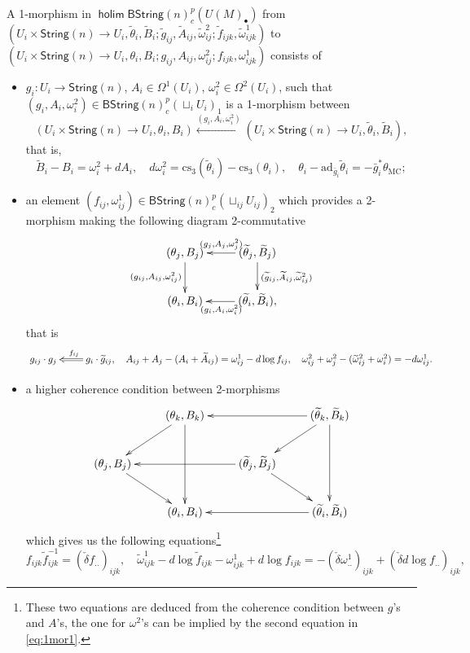 \documentclass[letterpaper,10pt, oneside]{article} %
\newcommand{\bstringnp}{\mathsf{BString}(n)^p_{c}} %
\newcommand{\String}{\mathsf{String}}%
\DeclareMathOperator{\holim}{\mathsf{holim}}
\newcommand{\cs}{\mathrm{cs}}
\newcommand{\TM}{\theta_{\scriptscriptstyle \mathrm{MC}}}
\newcommand{\ad}{\mathrm{ad}}
\newcommand{\tB}{\widetilde{B}}
\newcommand{\tg}{\widetilde{g}}
\newcommand{\tf}{\widetilde{f}}
\newcommand{\tA}{\widetilde{A}}
\newcommand{\tomega}{\widetilde{\omega}}
\newcommand{\ttheta}{\widetilde{\theta}}
\newcommand{\bg}{\bar{g}}
\begin{document}
A 1-morphism  in $\holim \bstringnp(U(M)_\bullet)$ from $(U_i\times \String(n)\to U_i, \ttheta_i, \widetilde{B}_i;
\widetilde{g}_{ij}, \tA_{ij}, \widetilde{\omega}^2_{ij}; \widetilde{ f}_{ijk}, \widetilde{\omega}^1_{ijk})$ to $(U_i\times \String(n)\to U_i, \theta_i, B_i;
g_{ij}, A_{ij}, \omega^2_{ij}; f_{ijk}, \omega^1_{ijk})$ consists of
\begin{itemize}
\item $g_i: U_i \to \String(n)$, $A_i\in \Omega^1(U_i)$, $\omega^2_{i}
  \in \Omega^2(U_i)$, such that $(g_i, A_i,
  \omega^2_i) \in \bstringnp(\sqcup_i U_i)_1$ is a 1-morphism between
\[(U_i\times \String(n)\to U_i, \theta_i, B_i) \xleftarrow {(g_i, A_i,
  \omega^2_i)} (U_i\times\String(n)\to U_i, \ttheta_i,  \tB_i),  \]
that is,
\begin{equation} \label{eq:1mor0}
    \tB_i-B_i =  \omega^2_i +dA_i, \quad d\omega^2_i =
\cs_3(\ttheta_i)-\cs_3(\theta_i), \quad \theta_i-\ad_{\bar{g}_i}
\ttheta_i = - \bg_i^* \TM;
\end{equation}
\item an element $(f_{ij}, \omega^1_{ij} ) \in \bstringnp(\sqcup_{ij}
  U_{ij})_2$ which provides a 2-morphism making the following diagram 2-commutative
\[
\xymatrix{
( \theta_j,B_j) \ar[d]_{(g_{ij}, A_{ij}, \omega^2_{ij})} & (\ttheta_j,\tB_j
) \ar[l]_{(g_j, A_j, \omega^2_j)} \ar[d]^{(\tg_{ij}, \tA_{ij},
  \tomega^2_{ij})} \\
(\theta_i,B_i ) & (\ttheta_i,\tB_i), \ar[l]^{(g_i, A_i, \omega^2_i)}
}
\]
that is
\begin{equation}\label{eq:1mor1}
\xymatrix{
g_{ij} \cdot g_j & \ar @{=>}[l]_{f_{ij}\qquad\qquad\qquad\qquad\qquad\qquad\qquad\qquad} g_i \cdot \tg_{ij},  \quad
A_{ij} + A_j - (A_i + \tA_{ij}) = \omega^1_{ij} - d\log f_{ij}, \quad
\omega^2_{ij} + \omega^2_j -(\tomega^2_{ij} + \omega^2_i) =
-d\omega^1_{ij}.}
\end{equation}

\item a higher coherence condition between 2-morphisms
\[
\xymatrix{ & ( \theta_k,B_k) \ar[dl] \ar[dd]& & ( \ttheta_k,\tB_k) \ar[dl]
  \ar[dd] \ar[ll] \\
( \theta_j,B_j) \ar[dr] & & (\ttheta_j,\tB_j) \ar[dr] \ar[ll] \\
& (\theta_i,B_i) && ( \ttheta_i,\tB_i) \ar[ll]}
\]
which gives us the following equations\footnote{These two equations
  are deduced from the coherence condition between $g$'s and $A$'s, the one for
  $\omega^2$'s can be implied by the second equation in \eqref{eq:1mor1}.}
\[
f_{ijk}\tf_{ijk} ^{-1} = (\check{\delta} f_{..})_{ijk}, \quad
\tomega_{ijk}^1-d\log \tf_{ijk} -\omega^1_{ijk} + d\log f_{ijk} =
-(\check{\delta}\omega_{..}^1)_{ijk} + (\check{\delta} d \log f_{..})_{ijk},
\]
\end{itemize}
\end{document}
